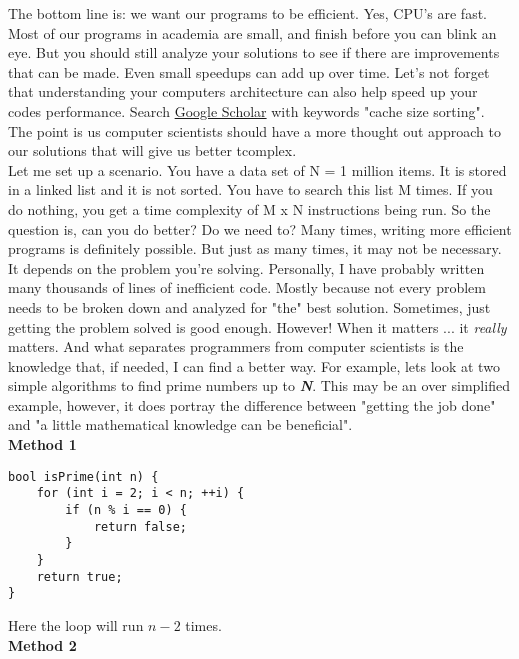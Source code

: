 
The bottom line is: we want our programs to be efficient. Yes, CPU's are fast. Most of our programs in academia are small, and finish before you can blink an eye. But you should still analyze your solutions to see if there are improvements that can be made. Even small speedups can add up over time. Let's not forget that understanding your computers architecture can also help speed up your codes performance. Search  \href{https://scholar.google.com/scholar?hl=en\&as_sdt=0\%2C44\&q=cache+size+sorting}{Google Scholar} with keywords "cache size sorting". The point is us computer scientists should have a more thought out approach to our solutions that will give us better \gls{tcomplex}.\\

Let me set up a scenario. You have a data set of N = 1 million items. It is stored in a linked list and it is not sorted. You have to search this list M times. If you do nothing, you get a time complexity of M x N instructions being run. So the question is, can you do better? Do we need to? Many times, writing more efficient programs is definitely possible. But just as many times, it may not be necessary. It depends on the problem you're solving. Personally, I have probably written many thousands of lines of inefficient code. Mostly because not every problem needs to be broken down and analyzed for "the" best solution. Sometimes, just getting the problem solved is good enough. However! When it matters ... it \textit{really} matters. And what separates programmers from computer scientists is the knowledge that, if needed, I can find a better way. For example, lets look at two simple algorithms to find prime numbers up to \textbf{\textit{N}}. This may be an over simplified example, however, it does portray the difference between "getting the job done" and "a little mathematical knowledge can be beneficial".\\

\textbf{Method 1}

\begin{verbatim}
bool isPrime(int n) {
    for (int i = 2; i < n; ++i) {
        if (n % i == 0) {
            return false;
        }
    }
    return true;
}
\end{verbatim}

Here the loop will run $n-2$ times.\\

\textbf{Method 2}

